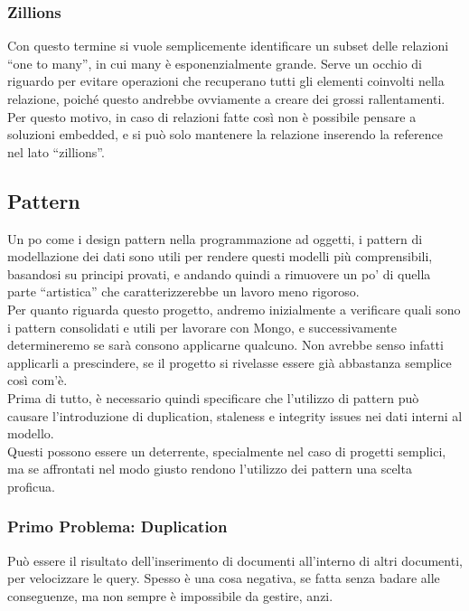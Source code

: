 \subsubsection{Zillions}
Con questo termine si vuole semplicemente identificare un subset delle relazioni ``one to many'', in cui many è esponenzialmente grande. Serve un occhio di riguardo per evitare operazioni che recuperano tutti gli elementi coinvolti nella relazione, poiché questo andrebbe ovviamente a creare dei grossi rallentamenti.
Per questo motivo, in caso di relazioni fatte così non è possibile pensare a soluzioni embedded, e si può solo mantenere la relazione inserendo la reference nel lato ``zillions''.

\subsection{Pattern}
Un po come i design pattern nella programmazione ad oggetti, i pattern di modellazione dei dati sono utili per rendere questi modelli più comprensibili, basandosi su principi provati, e andando quindi a rimuovere un po' di quella parte ``artistica'' che caratterizzerebbe un lavoro meno rigoroso.\\
Per quanto riguarda questo progetto, andremo inizialmente a verificare quali sono i pattern consolidati e utili per lavorare con Mongo, e successivamente determineremo se sarà consono applicarne qualcuno. Non avrebbe senso infatti applicarli a prescindere, se il progetto si rivelasse essere già abbastanza semplice così com'è.\\

\noindent Prima di tutto, è necessario quindi specificare che l'utilizzo di pattern può causare l'introduzione di duplication, staleness e integrity issues nei dati interni al modello.\\
Questi possono essere un deterrente, specialmente nel caso di progetti semplici, ma se affrontati nel modo giusto rendono l'utilizzo dei pattern una scelta proficua.\\

\subsubsection{Primo Problema: Duplication}
Può essere il risultato dell'inserimento di documenti all'interno di altri documenti, per velocizzare le query. Spesso è una cosa negativa, se fatta senza badare alle conseguenze, ma non sempre è impossibile da gestire, anzi.\\

